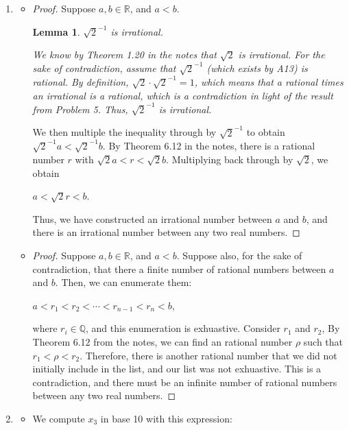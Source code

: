 \documentclass[12pt]{article}
\newtheorem{lemma}{Lemma}
\begin{document}
\begin{enumerate}[start = 1, label = {\bfseries Question \arabic*}, leftmargin=1in]
\item\begin{itemize}
    \item[(a)] \begin{proof}
        Suppose $a,b \in \mathbb{R}$, and $a<b$.\begin{lemma}
        ${\sqrt{2}}^{-1}$ is irrational.\upshape \par We know by Theorem 1.20 in the notes that $\sqrt{2}$ is irrational. For the sake of contradiction, assume that ${\sqrt{2}}^{-1}$ (which exists by A13) is rational. By definition, $\sqrt{2}\cdot {\sqrt{2}}^{-1} = 1$, which means that a rational times an irrational is a rational, which is a contradiction in light of the result from Problem 5. Thus, ${\sqrt{2}}^{-1}$ is irrational.
        \end{lemma}We then multiple the inequality through by ${\sqrt{2}}^{-1}$ to obtain ${\sqrt{2}}^{-1}a<{\sqrt{2}}^{-1}b$. By Theorem 6.12 in the notes, there is a rational number $r$ with $\sqrt{2}a<r<\sqrt{2}b$. Multiplying back through by $\sqrt{2}$, we obtain\begin{center}$a<\sqrt{2}r<b$.\end{center} Thus, we have constructed an irrational number between $a$ and $b$, and there is an irrational number between any two real numbers.
    \end{proof}
    \item[(b)] \begin{proof}
        Suppose $a,b \in \mathbb{R}$, and $a<b$. Suppose also, for the sake of contradiction, that there a finite number of rational numbers between $a$ and $b$. Then, we can enumerate them:\begin{center}
            $a<r_1<r_2<\cdots<r_{n-1}<r_n<b$,
        \end{center} where $r_i \in \mathbb{Q}$, and this enumeration is exhuastive. Consider $r_1$ and $r_2$, By Theorem 6.12 from the notes, we can find an rational number $\rho$ such that $r_1<\rho <r_2$. Therefore, there is another rational number that we did not initially include in the list, and our list was not exhuastive. This is a contradiction, and there must be an infinite number of rational numbers between any two real numbers.
    \end{proof}
\end{itemize}
\item
    \begin{itemize}
        \item[(a)] We compute $x_3$ in base 10 with this expression: \begin{center}

\end{center}
\end{itemize}
\end{enumerate}
\end{document}

